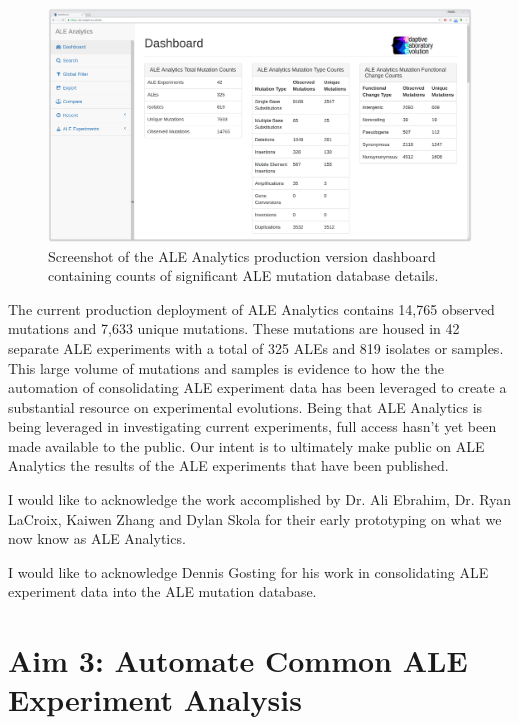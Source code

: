 \documentclass[12pt,final,masters,chapterheads]{ucsd}  %
\begin{document}
\begin{figure}[H]
  \centering
  \includegraphics[width=1\textwidth]{dashboard_screenshot.png}
  \caption{Screenshot of the ALE Analytics production version dashboard containing counts of significant ALE mutation database details.}
  \label{fig:dashboard_screenshot}
\end{figure}

The current production deployment of ALE Analytics contains 14,765 observed mutations and 7,633 unique mutations. These mutations are housed in 42 separate ALE experiments with a total of 325 ALEs and 819 isolates or samples. This large volume of mutations and samples is evidence to how the the automation of consolidating ALE experiment data has been leveraged to create a substantial resource on experimental evolutions. Being that ALE Analytics is being leveraged in investigating current experiments, full access hasn't yet been made available to the public. Our intent is to ultimately make public on ALE Analytics the results of the ALE experiments that have been published.

\clearpage
I would like to acknowledge the work accomplished by Dr. Ali Ebrahim, Dr. Ryan LaCroix, Kaiwen Zhang and Dylan Skola for their early prototyping on what we now know as ALE Analytics.

I would like to acknowledge Dennis Gosting for his work in consolidating ALE experiment data into the ALE mutation database.
% 
% 
\chapter{Aim 3: Automate Common ALE Experiment Analysis}
\end{document}

